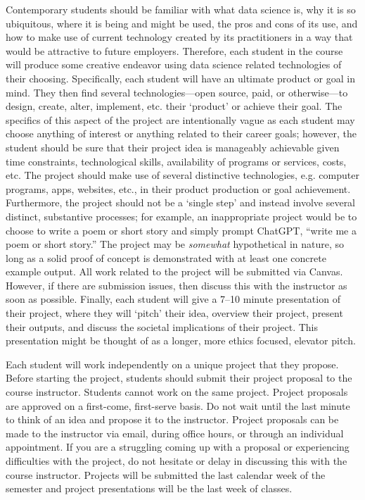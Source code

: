 \documentclass[11pt,letterpaper]{article}
\begin{document}
Contemporary students should be familiar with what data science is, why it is so ubiquitous, where it is being and might be used, the pros and cons of its use, and how to make use of current technology created by its practitioners in a way that would be attractive to future employers. Therefore, each student in the course will produce some creative endeavor using data science related technologies of their choosing. Specifically, each student will have an ultimate product or goal in mind. They then find several technologies---open source, paid, or otherwise---to design, create, alter, implement, etc. their `product' or achieve their goal. The specifics of this aspect of the project are intentionally vague as each student may choose anything of interest or anything related to their career goals; however, the student should be sure that their project idea is manageably achievable given time constraints, technological skills, availability of programs or services, costs, etc. The project should make use of several distinctive technologies, e.g. computer programs, apps, websites, etc., in their product production or goal achievement. Furthermore, the project should not be a `single step' and instead involve several distinct, substantive processes; for example, an inappropriate project would be to choose to write a poem or short story and simply prompt ChatGPT, ``write me a poem or short story.'' The project may be \textit{somewhat} hypothetical in nature, so long as a solid proof of concept is demonstrated with at least one concrete example output. All work related to the project will be submitted via Canvas. However, if there are submission issues, then discuss this with the instructor as soon as possible. Finally, each student will give a 7--10 minute presentation of their project, where they will `pitch' their idea, overview their project, present their outputs, and discuss the societal implications of their project. This presentation might be thought of as a longer, more ethics focused, elevator pitch. \pspace

Each student will work independently on a unique project that they propose. Before starting the project, students should submit their project proposal to the course instructor. Students cannot work on the same project. Project proposals are approved on a first-come, first-serve basis. Do not wait until the last minute to think of an idea and propose it to the instructor. Project proposals can be made to the instructor via email, during office hours, or through an individual appointment. If you are a struggling coming up with a proposal or experiencing difficulties with the project, do not hesitate or delay in discussing this with the course instructor. Projects will be submitted the last calendar week of the semester and project presentations will be the last week of classes. \pspace
\end{document}
